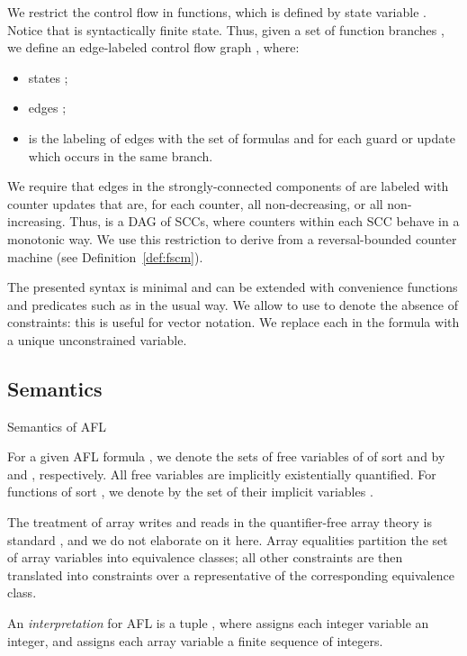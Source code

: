 We restrict the control flow in functions, which is defined by state variable . Notice that  is syntactically finite state. Thus, given a set of function branches , we define an edge-labeled control flow graph , where:
\begin{itemize}
\item states ;
\item edges ;
\item  is the labeling of edges with the set of formulas  and  for each guard or update which occurs in the same branch.
\end{itemize}
We require that edges in the strongly-connected components of  are labeled with counter updates that are, for each counter, all non-decreasing, or all non-increasing. Thus,  is a DAG of SCCs, where counters within each SCC behave in a monotonic way. We use this restriction to derive from  a reversal-bounded counter machine (see Definition~\ref{def:fscm}).

The presented syntax is minimal and can be extended with convenience functions and predicates such as  in the usual way. We allow to use  to denote the absence of constraints: this is useful for vector notation. We replace each  in the formula with a unique unconstrained variable.




\subsection{Semantics}


\begin{table}[t]

\vspace*{2mm}
\caption{Semantics of AFL}
\label{tab:semantics}
\end{table}


For a given AFL formula , we denote the sets of free variables of  of sort  and  by  and , respectively. All free variables are implicitly existentially quantified. For functions of sort , we denote by  the set of their implicit variables .


The treatment of array writes and reads in the quantifier-free array theory is standard \cite{QuantifierFreeArrays}, and we do not elaborate on it here.
Array equalities partition the set of array variables into equivalence classes; all other constraints are then translated into constraints over a representative of the corresponding equivalence class.

An \emph{interpretation} for AFL is a tuple , where
 assigns each integer variable an integer, and
 assigns each array variable a finite sequence of integers.



